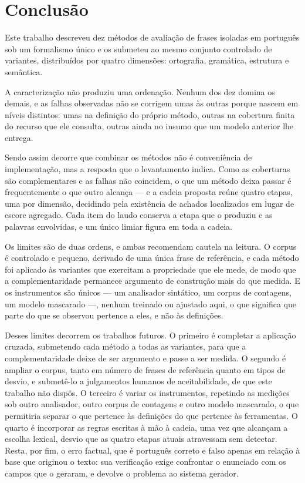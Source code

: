 \section{Conclusão}
\label{sec:conclusao}

\indent\indent Este trabalho descreveu dez métodos de avaliação de frases isoladas em português sob um
formalismo único e os submeteu ao mesmo conjunto controlado de variantes, distribuídos por
quatro dimensões: ortografia, gramática, estrutura e semântica.

A caracterização não produziu uma ordenação. Nenhum dos dez domina os demais, e as falhas
observadas não se corrigem umas às outras porque nascem em níveis distintos: umas na definição
do próprio método, outras na cobertura finita do recurso que ele consulta, outras ainda no
insumo que um modelo anterior lhe entrega.

Sendo assim decorre que combinar os métodos não é conveniência de implementação, mas a resposta que o
levantamento indica. Como as coberturas são complementares e as falhas não coincidem, o que
um método deixa passar é frequentemente o que outro alcança --- e a cadeia proposta reúne
quatro etapas, uma por dimensão, decidindo pela existência de achados localizados em lugar de
escore agregado. Cada item do laudo conserva a etapa que o produziu e as palavras envolvidas, e
um único limiar figura em toda a cadeia.

Os limites são de duas ordens, e ambas recomendam cautela na leitura. O corpus é controlado e
pequeno, derivado de uma única frase de referência, e cada método foi aplicado às variantes que
exercitam a propriedade que ele mede, de modo que a complementaridade permanece argumento de
construção mais do que medida. E os instrumentos são únicos --- um analisador sintático, um
corpus de contagens, um modelo mascarado ---, nenhum treinado ou ajustado aqui, o que significa
que parte do que se observou pertence a eles, e não às definições.

Desses limites decorrem os trabalhos futuros. O primeiro é completar a aplicação cruzada,
submetendo cada método a todas as variantes, para que a complementaridade deixe de ser
argumento e passe a ser medida. O segundo é ampliar o corpus, tanto em número de frases de
referência quanto em tipos de desvio, e submetê-lo a julgamentos humanos de aceitabilidade,
de que este trabalho não dispôs. O terceiro é variar os instrumentos, repetindo as medições sob
outro analisador, outro corpus de contagens e outro modelo mascarado, o que permitiria separar
o que pertence às definições do que pertence às ferramentas. O quarto é incorporar as regras
escritas à mão à cadeia, uma vez que alcançam a escolha lexical, desvio que as quatro etapas
atuais atravessam sem detectar. Resta, por fim, o erro factual, que é português correto e falso
apenas em relação à base que originou o texto: sua verificação exige confrontar o enunciado com
os campos que o geraram, e devolve o problema ao sistema gerador.
